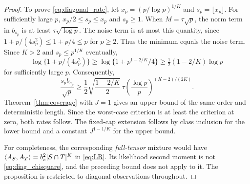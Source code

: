 \begin{proof}
To prove \eqref{eq:diagonal_rate}, let
$x_p=(p/\log p)^{1/K}$ and $s_p=\lfloor x_p\rfloor$. For sufficiently large $p$,
$x_p/2\le s_p\le x_p$ and $s_p\ge1$. When $M=\tau\sqrt p$, the norm term in $b_{s_p}$ is at least $\tau\sqrt{\log p}$. The noise term is at most this quantity, since $1+p/(4s_p^2)\le1+p/4\le p$ for $p\ge2$. Thus the minimum equals the noise term. Since $K>2$ and $s_p\le p^{1/K}$ eventually,
\[
 \log\{1+p/(4s_p^2)\}
 \ge\log\{1+p^{1-2/K}/4\}
 \ge\tfrac12(1-2/K)\log p
\]
for sufficiently large $p$. Consequently,
\[
 \frac{s_p b_{s_p}}{\sqrt p}
 \ge \frac12\sqrt{\frac{1-2/K}{2}}\,
 \tau\left(\frac{\log p}{p}\right)^{(K-2)/(2K)}.
\]
Theorem~\ref{thm:coverage} with $J=1$ gives an upper bound of the same order and deterministic length. Since the worst-case criterion is at least the criterion at zero, both rates follow. The fixed-cap extension follows by class inclusion for the lower bound and a constant $J^{1-1/K}$ for the upper bound.

For completeness, the corresponding \emph{full-tensor} mixture would have
$\langle A_S,A_T\rangle=b_s^2|S\cap T|^K$ in \eqref{eq:LR}. Its likelihood second moment is not \eqref{eq:diag_chisquare}, and the preceding bound does not apply to it. The proposition is restricted to diagonal observations throughout.
\end{proof}

